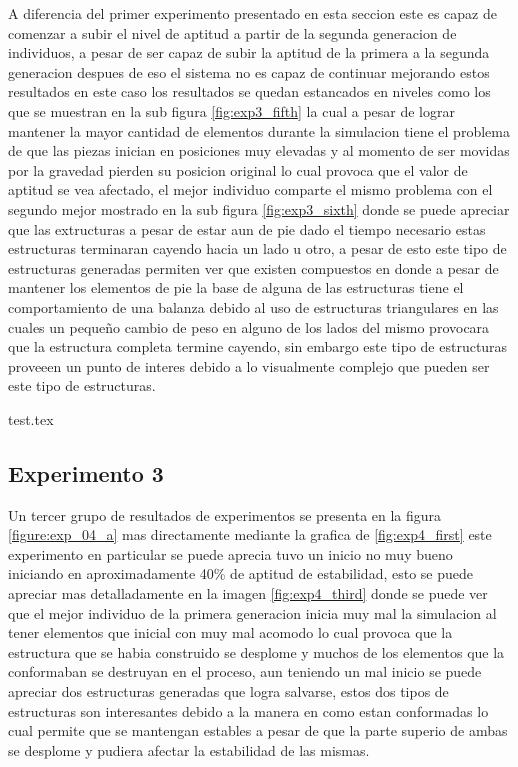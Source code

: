 A diferencia del primer experimento presentado en esta seccion este es capaz de
comenzar a subir el nivel de aptitud a partir de la segunda generacion de
individuos, a pesar de ser capaz de subir la aptitud de la primera a la segunda
generacion despues de eso el sistema no es capaz de continuar mejorando estos
resultados en este caso los resultados se quedan estancados en niveles como los
que se muestran en la sub figura \ref{fig:exp3_fifth} la cual a pesar de lograr
mantener la mayor cantidad de elementos durante la simulacion tiene el problema
de que las piezas inician en posiciones muy elevadas y al momento de ser movidas
por la gravedad pierden su posicion original lo cual provoca que el valor de
aptitud se vea afectado, el mejor individuo comparte el mismo problema con el
segundo mejor mostrado en la sub figura \ref{fig:exp3_sixth} donde se puede
apreciar que las extructuras a pesar de estar aun de pie dado el tiempo
necesario estas estructuras terminaran cayendo hacia un lado u otro, a pesar de
esto este tipo de estructuras generadas permiten ver que existen compuestos en
donde a pesar de mantener los elementos de pie la base de alguna de las
estructuras tiene el comportamiento de una balanza debido al uso de estructuras
triangulares en las cuales un pequeño cambio de peso en alguno de los lados del
mismo provocara que la estructura completa termine cayendo, sin embargo este
tipo de estructuras proveeen un punto de interes debido a lo visualmente
complejo que pueden ser este tipo de estructuras.

{test.tex}

\newpage

\subsection{Experimento 3}
\label{chap6:exp_3}

Un tercer grupo de resultados de experimentos se presenta en la figura
\ref{figure:exp_04_a} mas directamente mediante la grafica de
\ref{fig:exp4_first} este experimento en particular se puede aprecia tuvo un
inicio no muy bueno iniciando en aproximadamente 40\% de aptitud de estabilidad,
esto se puede apreciar mas detalladamente en la imagen \ref{fig:exp4_third}
donde se puede ver que el mejor individuo de la primera generacion inicia muy
mal la simulacion al tener elementos que inicial con muy mal acomodo lo cual
provoca que la estructura que se habia construido se desplome y muchos de los
elementos que la conformaban se destruyan en el proceso, aun teniendo un mal
inicio se puede apreciar dos estructuras generadas que logra salvarse, estos dos
tipos de estructuras son interesantes debido a la manera en como estan
conformadas lo cual permite que se mantengan estables a pesar de que la parte
superio de ambas se desplome y pudiera afectar la estabilidad de las mismas. 

